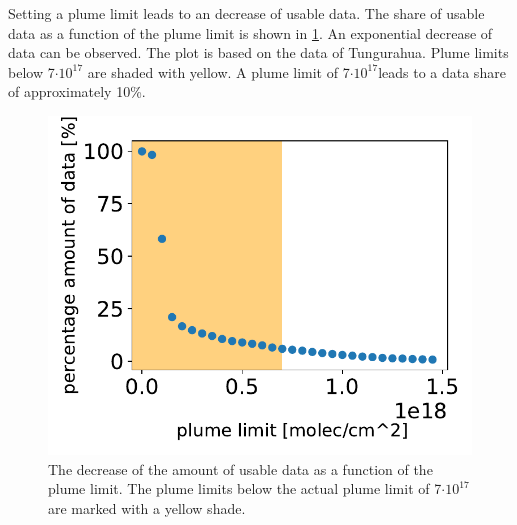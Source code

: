 Setting a plume limit leads to an decrease of usable data. The share of usable  data as a function of the plume limit is shown in \cref{fig:percentageminso2}. An exponential decrease of data can be observed. The plot is based on the data of Tungurahua. Plume limits below 7$\cdot10^{17}$ are shaded with yellow. A plume limit of 7$\cdot10^{17}$leads to a data share of approximately 10\%.
\begin{figure}
	\centering
	\includegraphics[width=0.7\linewidth]{Bilder/percentage_minSO2}
	\caption{The decrease of the amount of usable data as a function of the plume limit. The plume limits below the actual plume limit of 7$\cdot10^{17}$ are marked with a yellow shade.}
	\label{fig:percentageminso2}
\end{figure}

